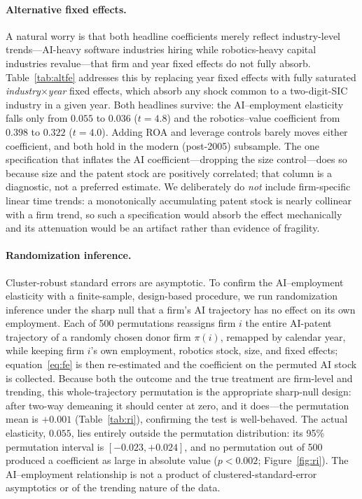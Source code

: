 \documentclass[12pt]{article}
\begin{document}
\paragraph{Alternative fixed effects.} A natural worry is that both headline coefficients merely
reflect industry-level trends---AI-heavy software industries hiring while robotics-heavy capital
industries revalue---that firm and year fixed effects do not fully absorb. Table~\ref{tab:altfe}
addresses this by replacing year fixed effects with fully saturated \emph{industry$\times$year}
fixed effects, which absorb any shock common to a two-digit-SIC industry in a given year. Both
headlines survive: the AI--employment elasticity falls only from $0.055$ to $0.036$ ($t=4.8$) and
the robotics--value coefficient from $0.398$ to $0.322$ ($t=4.0$). Adding ROA and leverage
controls barely moves either coefficient, and both hold in the modern (post-2005) subsample. The
one specification that inflates the AI coefficient---dropping the size control---does so because
size and the patent stock are positively correlated; that column is a diagnostic, not a preferred
estimate. We deliberately do \emph{not} include firm-specific linear time trends: a monotonically
accumulating patent stock is nearly collinear with a firm trend, so such a specification would
absorb the effect mechanically and its attenuation would be an artifact rather than evidence of
fragility.

\paragraph{Randomization inference.} Cluster-robust standard errors are asymptotic. To confirm the
AI--employment elasticity with a finite-sample, design-based procedure, we run randomization
inference under the sharp null that a firm's AI trajectory has no effect on its own employment.
Each of 500 permutations reassigns firm $i$ the entire AI-patent trajectory of a randomly chosen
donor firm $\pi(i)$, remapped by calendar year, while keeping firm $i$'s own employment, robotics
stock, size, and fixed effects; equation~\eqref{eq:fe} is then re-estimated and the coefficient on
the permuted AI stock is collected. Because both the outcome and the true treatment are firm-level
and trending, this whole-trajectory permutation is the appropriate sharp-null design: after
two-way demeaning it should center at zero, and it does---the permutation mean is $+0.001$
(Table~\ref{tab:ri}), confirming the test is well-behaved. The actual elasticity, $0.055$, lies
entirely outside the permutation distribution: its 95\% permutation interval is
$[-0.023,+0.024]$, and no permutation out of 500 produced a coefficient as large in absolute
value ($p<0.002$; Figure~\ref{fig:ri}). The AI--employment relationship is not a product of
clustered-standard-error asymptotics or of the trending nature of the data.
\end{document}
